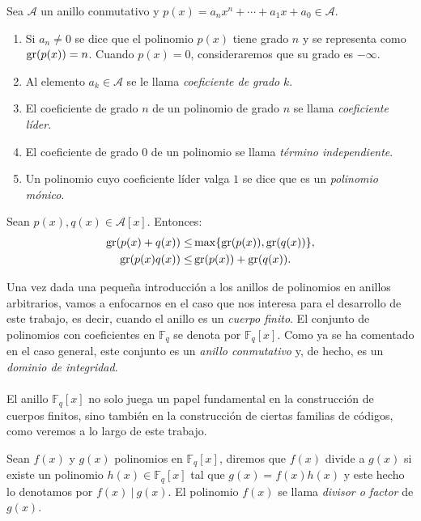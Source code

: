 \begin{definicion} Sea $\mathcal{A}$ un anillo conmutativo y $p(x) = a_nx^n + \cdots + a_1x + a_0 \in \mathcal{A}$.

    \begin{enumerate}
        \item Si $a_n \neq 0$ se dice que el polinomio $p(x)$ tiene grado $n$ y se representa como $\operatorname{gr}(p(x)) = n$. Cuando $p(x) = 0$, consideraremos que su grado es $-\infty$. 
        \item Al elemento $a_k \in \mathcal{A}$ se le llama \emph{coeficiente de grado} $k$.
        \item El coeficiente de grado $n$ de un polinomio de grado $n$ se llama \emph{coeficiente líder}.
        \item El coeficiente de grado $0$ de un polinomio se llama \emph{término independiente}.
        \item Un polinomio cuyo coeficiente líder valga $1$ se dice que es un \emph{polinomio mónico}.
    \end{enumerate}
\end{definicion}

\begin{proposicion} Sean $p(x),q(x) \in \mathcal{A}[x]$. Entonces:
\begin{align*}
    \operatorname{gr}(p(x) + q(x)) \leq& \max\{\operatorname{gr}(p(x)),\operatorname{gr}(q(x))\}, \\
    \operatorname{gr}(p(x)q(x)) \leq& \operatorname{gr}(p(x)) + \operatorname{gr}(q(x)).
 \end{align*}

\end{proposicion}

Una vez dada una pequeña introducción a los anillos de polinomios en anillos arbitrarios, vamos a enfocarnos en el caso que nos interesa para el desarrollo de este trabajo, es decir, cuando el anillo es un \emph{cuerpo finito}. El conjunto de polinomios con coeficientes en $\mathbb{F}_q$ se denota por $\mathbb{F}_q[x]$. Como ya se ha comentado en el caso general, este conjunto es un \emph{anillo conmutativo} y, de hecho, es un \emph{dominio de integridad}.
\\ \\
El anillo $\mathbb{F}_q[x]$ no solo juega un papel fundamental en la construcción de cuerpos finitos, sino también en la construcción de ciertas familias de códigos, como veremos a lo largo de este trabajo.

Sean $f(x)$ y $g(x)$ polinomios en $\mathbb{F}_q[x]$, diremos que $f(x)$ divide a $g(x)$ si existe un polinomio $h(x) \in \mathbb{F}_q[x]$ tal que $g(x) = f(x)h(x)$ y este hecho lo denotamos por $f(x) \ | \ g(x)$. El polinomio $f(x)$ se llama \emph{divisor o factor} de $g(x)$. 

